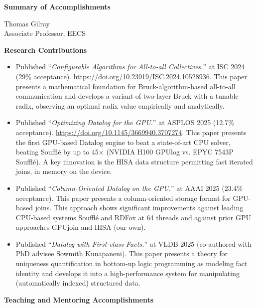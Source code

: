 \documentclass[line]{res}
\begin{document}
\centering
\textbf{Summary of Accomplishments}

\vspace{-0.25cm}
Thomas Gilray \\
Associate Professor, EECS
\vspace{0.25cm}

\textbf{Research Contributions}

\begin{itemize}

\item Published ``\textit{Configurable Algorithms for All-to-all Collectives.}'' at ISC 2024 (29\% acceptance). \url{https://doi.org/10.23919/ISC.2024.10528936}. This paper presents a mathematical foundation for Bruck-algorithm-based all-to-all communication and develops a variant of two-layer Bruck with a tunable radix, observing an optimal radix value empirically and analytically. 

\item Published ``\textit{Optimizing Datalog for the GPU.}'' at ASPLOS 2025 (12.7\% acceptance). \url{https://doi.org/10.1145/3669940.3707274}. This paper presents the first GPU-based Datalog engine to beat a state-of-art CPU solver, beating Souffl\'e by up to 45× (NVIDIA H100 GPUlog vs. EPYC 7543P Soufflé). A key innovation is the HISA data structure permitting fast iterated joins, in memory on the device.

\item Published ``\textit{Column-Oriented Datalog on the GPU.}'' at AAAI 2025 (23.4\% acceptance). This paper presents a column-oriented storage format for GPU-based joins. This approach shows significant improvements against leading CPU-based systems Souffl\'e and RDFox at 64 threads and against prior GPU approaches GPUjoin and HISA (our own).
  
\item Published ``\textit{Datalog with First-class Facts.}'' at VLDB 2025 (co-authored with PhD advisee Sowmith Kunapaneni). This paper presents a theory for uniqueness quantification in bottom-up logic programming as modeling fact identity and develops it into a high-performance system for manipulating (automatically indexed) structured data. 
  
\end{itemize}

\textbf{Teaching and Mentoring Accomplishments}
\end{document}
